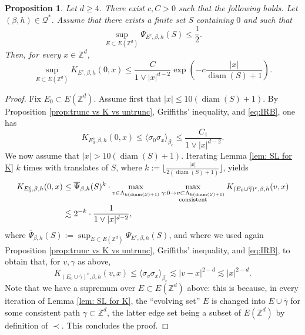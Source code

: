 \documentclass[11pt,a4paper]{article}
\numberwithin{equation}{section}
\theoremstyle{plain}
\newtheorem{Prop}[Thm]{Proposition}
\theoremstyle{definition}
\begin{document}
\begin{Prop}\label{prop:sufficient condition to exp decay} Let $d\geq 4$. There exist $c,C>0$ such that the following holds. Let $(\beta,h)\in \mathcal Q^*$. Assume that there exists a finite set $S$ containing $0$ and such that
\begin{equation}\label{eq: assumption to get exp decay}
	\sup_{E\subset E(\mathbb Z^d)}\Psi_{E^c,\beta,h}(S)\leq \frac{1}{2}.
\end{equation}
Then, for every $x\in \mathbb Z^d$,
\begin{equation}
	\sup_{E\subset E(\mathbb Z^d)}K_{E^c,\beta,h}(0,x)\leq \frac{C}{1\vee |x|^{d-2}}\exp\left(-c\frac{|x|}{\operatorname{diam}(S)+1}\right).
\end{equation}
\end{Prop}
\begin{proof} Fix $E_0\subset E(\mathbb Z^d)$. Assume first that $|x|\leq 10(\operatorname{diam}(S)+1)$. By Proposition \ref{prop:trunc vs K vs untrunc}, Griffiths' inequality, and \eqref{eq:IRB}, one has \begin{equation}\label{eq:pf suff 1}
	K_{E_0^c,\beta,h}(0,x)\leq  \langle \sigma_0\sigma_x\rangle_{\beta_c}\leq \frac{C_1}{1\vee |x|^{d-2}}.
\end{equation}
We now assume that $|x|>10(\operatorname{diam}(S)+1)$. Iterating Lemma \ref{lem: SL for K} $k$ times with translates of $S$, where $k:=\lfloor\tfrac{|x|}{2(\operatorname{diam}(S)+1)}\rfloor$, yields
\begin{align}	
\begin{aligned}
	K_{E_0^c,\beta,h}(0,x)&\leq \overline{\Psi}_{\beta,h}(S)^k\cdot \max_{v\in \Lambda_{k(\operatorname{diam}(S)+1)}}\max_{\substack{\gamma:0\rightarrow v\subset \Lambda_{k(\operatorname{diam}(S)+1)} \\\textup{consistent}}}K_{(E_0\cup\overline{\gamma})^c,\beta,h}(v,x)\\&\lesssim 2^{-k}\cdot  \frac{1}{1\vee |x|^{d-2}},
\end{aligned}
\end{align}
where $\overline{\Psi}_{\beta,h}(S):=\sup_{E\subset E(\mathbb Z^d)}\Psi_{E^c,\beta,h}(S)$, and
where we used again Proposition \ref{prop:trunc vs K vs untrunc}, Griffiths' inequality, and \eqref{eq:IRB}, to obtain that, for $v,\gamma$ as above, 
\begin{equation}
K_{(E_0\cup\overline{\gamma})^c,\beta,h}(v,x)\leq \langle \sigma_v\sigma_x\rangle_{\beta_c}\lesssim |v-x|^{2-d}\lesssim |x|^{2-d}.
\end{equation} 
Note that we have a supremum over $E\subset E(\mathbb Z^d)$ above: this is because, in every iteration of Lemma \ref{lem: SL for K}, the ``evolving set'' $E$ is changed into $E\cup \overline{\gamma}$ for some consistent path $\gamma\subset \mathbb Z^d$, the latter edge set being a subset of $E(\mathbb Z^d)$ by definition of $\prec$. This concludes the proof.
\end{proof}
\end{document}
